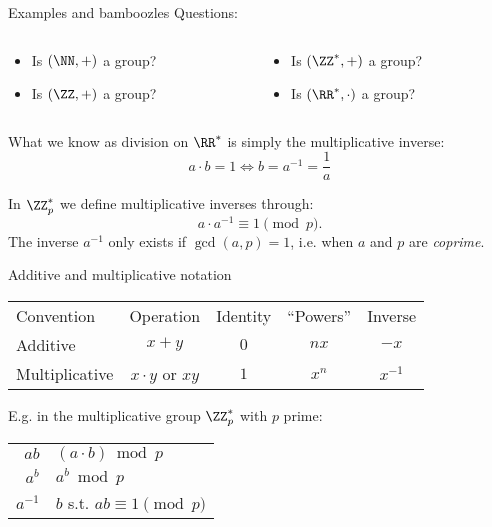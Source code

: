 \begin{frame}{Examples and bamboozles}
  Questions:
  \begin{columns}[T]
    \begin{column}{0.4\textwidth}
        \begin{itemize}[<+(1)->]
        \item Is $(\NN, +)$ a group?
        \item Is $(\ZZ, +)$ a group?
      \end{itemize}
    \end{column}
    \begin{column}{0.4\textwidth}
      \begin{itemize}[<+(1)->]
        \item Is $(\ZZ^*, +)$ a group?
        \item Is $(\RR^*, \cdot)$ a group?
      \end{itemize}
    \end{column}
  \end{columns}

  \vspace*{1em}

  \pause
  What we know as division on $\RR^*$ is simply the multiplicative inverse:
  \[
    a \cdot b = 1 \iff b = a^{-1} = \frac{1}{a}
  \]

  \pause
  In $\ZZ_p^*$ we define multiplicative inverses through:
  \[
    a\cdot a^{-1} \equiv 1 \pmod{p}.
  \]
  \pause
  The inverse $a^{-1}$ only exists if $\gcd(a,p) = 1$, i.e. when $a$ and $p$ are \emph{coprime}.
\end{frame}

\begin{frame}{Additive and multiplicative notation}
  \begin{center}
  \begin{tabular}{@{}l c c c c@{}}
    \toprule
    Convention & Operation & Identity & \enquote{Powers} & Inverse\\
    \cmidrule{1-5}
    Additive & $x + y$ & $0$ & $nx$ & $-x$\\
    \cmidrule{1-5}
    Multiplicative & $x\cdot y$ or $xy$ & $1$ & $x^n$ & $x^{-1}$\\
    \bottomrule
  \end{tabular}
  \end{center}

  \pause
  E.g. in the multiplicative group $\ZZ_p^*$ with $p$ prime:

  \begin{tabular}{r l}
    \pause $ab$     & $(a \cdot b) \bmod{p}$\\
    \pause $a^b$    & $a^b \bmod{p}$\\
    \pause $a^{-1}$ & $b$ s.t. $ab \equiv 1 \pmod{p}$
  \end{tabular}
\end{frame}

